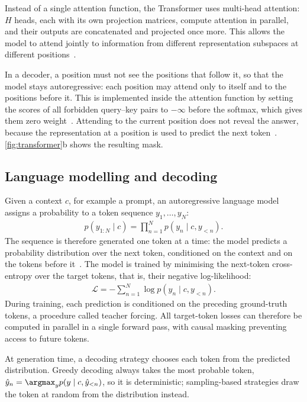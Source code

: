 Instead of a single attention function, the Transformer uses multi-head attention: $H$ heads, each with its own projection matrices, compute attention in parallel, and their outputs are concatenated and projected once more. This allows the model to attend jointly to information from different representation subspaces at different positions~\cite{vaswani2017attention}.

In a decoder, a position must not see the positions that follow it, so that the model stays autoregressive: each position may attend only to itself and to the positions before it. This is implemented inside the attention function by setting the scores of all forbidden query--key pairs to $-\infty$ before the softmax, which gives them zero weight~\cite{vaswani2017attention}. Attending to the current position does not reveal the answer, because the representation at a position is used to predict the next token~\cite{vaswani2017attention}. \autoref{fig:transformer}b shows the resulting mask.

\subsection{Language modelling and decoding}
\label{sec:decoding}

Given a context $c$, for example a prompt, an autoregressive language model assigns a probability to a token sequence $y_1, \dots, y_N$:
\begin{align}
  p(y_{1:N} \mid c) = \prod_{n=1}^{N} p(y_n \mid c, y_{<n}).
  \label{eq:lm-factorisation}
\end{align}
The sequence is therefore generated one token at a time: the model predicts a probability distribution over the next token, conditioned on the context and on the tokens before it~\cite{vaswani2017attention}. The model is trained by minimising the next-token cross-entropy over the target tokens, that is, their negative log-likelihood:
\begin{align}
  \mathcal{L} = -\sum_{n=1}^{N} \log p(y_n \mid c, y_{<n}).
  \label{eq:lm-loss}
\end{align}
During training, each prediction is conditioned on the preceding ground-truth tokens, a procedure called teacher forcing. All target-token losses can therefore be computed in parallel in a single forward pass, with causal masking preventing access to future tokens.

At generation time, a decoding strategy chooses each token from the predicted distribution. Greedy decoding always takes the most probable token, $\hat{y}_n = \argmax_{y} p(y \mid c, \hat{y}_{<n})$, so it is deterministic; sampling-based strategies draw the token at random from the distribution instead.

